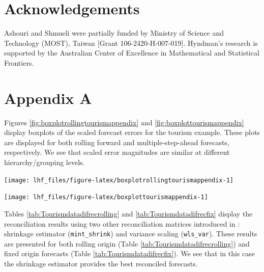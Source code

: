 \documentclass[11pt,a4paper,]{article}
\let\origfigure\figure
\let\endorigfigure\endfigure
\renewenvironment{figure}[1][2] {
    \expandafter\origfigure\expandafter[!htbp]
} {
    \endorigfigure
}
\begin{document}
\hypertarget{acknowledgements}{%
\section*{Acknowledgements}\label{acknowledgements}}

Ashouri and Shmueli were partially funded by Ministry of Science and Technology (MOST), Taiwan {[}Grant 106-2420-H-007-019{]}. Hyndman's research is supported by the Australian Center of Excellence in Mathematical and Statistical Frontiers.

\clearpage

\hypertarget{appendix-appendix}{%
\appendix}


\hypertarget{appendix-a}{%
\section{Appendix A}\label{appendix-a}}

Figures \ref{fig:boxplotrollingtourismappendix} and \ref{fig:boxplottourismappendix} display boxplots of the scaled forecast errors for the tourism example. These plots are displayed for both rolling forward and multiple-step-ahead forecasts, respectively. We see that scaled error magnitudes are similar at different hierarchy/grouping levels.

\begin{figure}

{\centering \texttt{[image: lhf\_files/figure-latex/boxplotrollingtourismappendix-1]} 

}

\caption{Box plots of scaled forecast errors from reconciled and unreconciled ETS, ARIMA, and OLS rolling origin forecasts for tourism demand data. Panels are different hierarchy levels.}\label{fig:boxplotrollingtourismappendix}
\end{figure}

\begin{figure}

{\centering \texttt{[image: lhf\_files/figure-latex/boxplottourismappendix-1]} 

}

\caption{Box plots of scaled forecast errors from reconciled and unreconciled ETS, ARIMA, and OLS fixed origin forecasts for tourism demand data. Panels are different hierarchy levels.}\label{fig:boxplottourismappendix}
\end{figure}

Tables \ref{tab:Tourismdatadifrecrolling} and \ref{tab:Tourismdatadifrecfix} display the reconciliation results using two other reconciliation matrices introduced in \autocite{mint2018}: shrinkage estimator (\texttt{mint\_shrink}) and variance scaling (\texttt{wls\_var}). These results are presented for both rolling origin (Table \ref{tab:Tourismdatadifrecrolling}) and fixed origin forecasts (Table \ref{tab:Tourismdatadifrecfix}). We see that in this case the shrinkage estimator provides the best reconciled forecasts.
\end{document}
